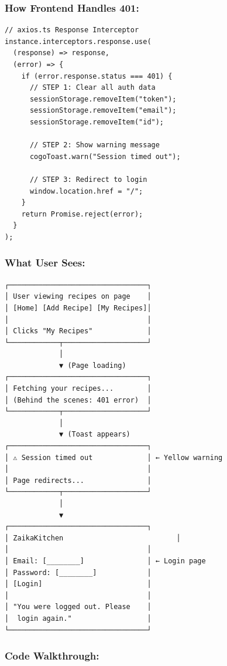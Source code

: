 \documentclass[12pt]{article}
\begin{document}
\subsubsection*{How Frontend Handles 401:}

\begin{lstlisting}
// axios.ts Response Interceptor
instance.interceptors.response.use(
  (response) => response,
  (error) => {
    if (error.response.status === 401) {
      // STEP 1: Clear all auth data
      sessionStorage.removeItem("token");
      sessionStorage.removeItem("email");
      sessionStorage.removeItem("id");
      
      // STEP 2: Show warning message
      cogoToast.warn("Session timed out");
      
      // STEP 3: Redirect to login
      window.location.href = "/";
    }
    return Promise.reject(error);
  }
);
\end{lstlisting}

\subsubsection*{What User Sees:}

\begin{lstlisting}
┌─────────────────────────────────┐
│ User viewing recipes on page    │
│ [Home] [Add Recipe] [My Recipes]│
│                                 │
│ Clicks "My Recipes"             │
└────────────┬────────────────────┘
             │
             ▼ (Page loading)
┌─────────────────────────────────┐
│ Fetching your recipes...        │
│ (Behind the scenes: 401 error)  │
└────────────┬────────────────────┘
             │
             ▼ (Toast appears)
┌─────────────────────────────────┐
│ ⚠ Session timed out             │ ← Yellow warning
│                                 │
│ Page redirects...               │
└────────────┬────────────────────┘
             │
             ▼
┌─────────────────────────────────┐
│ ZaikaKitchen                           │
│                                 │
│ Email: [________]               │ ← Login page
│ Password: [________]            │
│ [Login]                         │
│                                 │
│ "You were logged out. Please    │
│  login again."                  │
└─────────────────────────────────┘
\end{lstlisting}

\subsubsection*{Code Walkthrough:}
\end{document}
